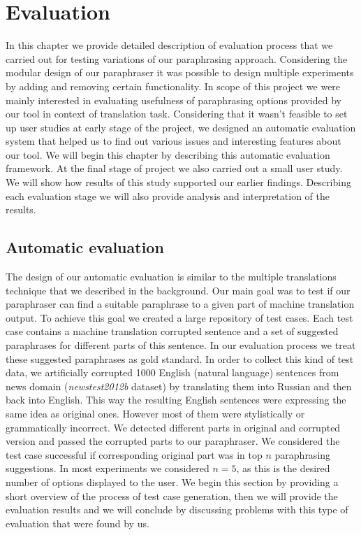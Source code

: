 
\chapter{Evaluation}

In this chapter we provide detailed description of evaluation process that we carried out for testing variations of our paraphrasing approach. Considering the modular design of our paraphraser it was possible to design multiple experiments by adding and removing certain functionality. In scope of this project we were mainly interested in evaluating usefulness of paraphrasing options provided by our tool in context of translation task. Considering that it wasn't feasible to set up user studies at early stage of the project, we designed an automatic evaluation system that helped us to find out various issues and interesting features about our tool. We will begin this chapter by describing this automatic evaluation framework. At the final stage of project we also carried out a small user study. We will show how results of this study supported our earlier findings. Describing each evaluation stage we will also provide analysis and interpretation of the results.

\section{Automatic evaluation}

The design of our automatic evaluation is similar to the multiple translations technique that we described in the background. Our main goal was to test if our paraphraser can find a suitable paraphrase to a given part of machine translation output. To achieve this goal we created a large repository of test cases. Each test case contains a machine translation corrupted sentence and a set of suggested paraphrases for different parts of this sentence. In our evaluation process we treat these suggested paraphrases as gold standard. In order to collect this kind of test data, we artificially corrupted 1000 English (natural language) sentences from news domain (\emph{newstest2012b} dataset) by translating them into Russian and then back into English. This way the resulting English sentences were expressing the same idea as original ones. However most of them were stylistically or grammatically incorrect. We detected different parts in original and corrupted version and passed the corrupted parts to our paraphraser. We considered the test case successful if corresponding original part was in top $n$ paraphrasing suggestions. In most experiments we considered $n = 5$, as this is the desired number of options displayed to the user. We begin this section by providing a short overview of the process of test case generation, then we will provide the evaluation results and we will conclude by discussing problems with this type of evaluation that were found by us.

